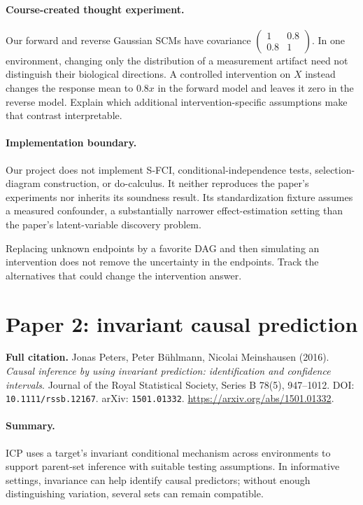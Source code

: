 \documentclass[11pt]{scrartcl}
\begin{document}
\paragraph{Course-created thought experiment.} Our forward and reverse Gaussian SCMs
have covariance $\begin{pmatrix}1&0.8\\0.8&1\end{pmatrix}$. In one environment,
changing only the distribution of a measurement artifact need not distinguish their
biological directions. A controlled intervention on $X$ instead changes the response
mean to $0.8x$ in the forward model and leaves it zero in the reverse model. Explain
which additional intervention-specific assumptions make that contrast interpretable.

\paragraph{Implementation boundary.} Our project does not implement S-FCI,
conditional-independence tests, selection-diagram construction, or do-calculus.
It neither reproduces the paper's experiments nor inherits its soundness result.
Its standardization fixture assumes a measured confounder, a substantially narrower
effect-estimation setting than the paper's latent-variable discovery problem.

\begin{pitfall}
Replacing unknown endpoints by a favorite DAG and then simulating an intervention
does not remove the uncertainty in the endpoints. Track the alternatives that could
change the intervention answer.
\end{pitfall}

\clearpage
\section*{Paper 2: invariant causal prediction}
\textbf{Full citation.} Jonas Peters, Peter B\"uhlmann, Nicolai Meinshausen (2016).
\emph{Causal inference by using invariant prediction: identification and confidence
intervals}. Journal of the Royal Statistical Society, Series B 78(5), 947--1012.
DOI: \texttt{10.1111/rssb.12167}. arXiv: \texttt{1501.01332}.
\url{https://arxiv.org/abs/1501.01332}.

\paragraph{Summary.} ICP uses a target's invariant conditional mechanism across
environments to support parent-set inference with suitable testing assumptions.
In informative settings, invariance can help identify causal predictors; without
enough distinguishing variation, several sets can remain compatible.
\end{document}
